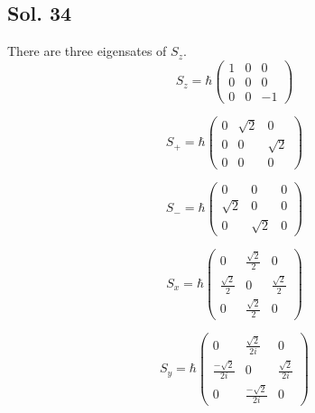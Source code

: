        \subsection*{Sol. 34}
       There are three eigensates of $S_z.$
       $$
       S_z =
       \hbar
       \begin{pmatrix}
           1 & 0 & 0\\
           0 & 0 & 0\\
           0 & 0 & -1
       \end{pmatrix}
       $$

       $$
       S_+ =
       \hbar
       \begin{pmatrix}
           0 & \sqrt{2} & 0\\
           0 & 0 & \sqrt{2}\\
           0 & 0 & 0
       \end{pmatrix}
       $$

       $$
       S_- =
       \hbar
       \begin{pmatrix}
           0 & 0 & 0\\
           \sqrt{2} & 0 & 0\\
           0 & \sqrt{2} & 0
       \end{pmatrix}
       $$

       $$
       S_x = 
       \hbar 
       \begin{pmatrix}
           0 & \frac{\sqrt{2}}{2} & 0\\
           \frac{\sqrt{2}}{2} & 0 & \frac{\sqrt{2}}{2}\\
           0 & \frac{\sqrt{2}}{2} & 0
       \end{pmatrix}
       $$

       $$
       S_y = 
       \hbar 
       \begin{pmatrix}
           0 & \frac{\sqrt{2}}{2i} & 0\\
           \frac{-\sqrt{2}}{2i} & 0 & \frac{\sqrt{2}}{2i}\\
           0 & \frac{-\sqrt{2}}{2i} & 0
       \end{pmatrix}
       $$

